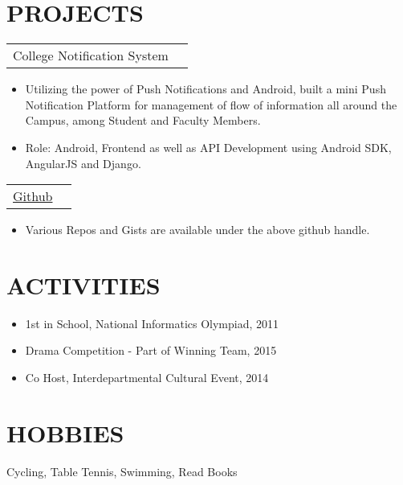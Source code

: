\documentclass[margin]{res}
\begin{document}
\begin{resume}
\section{PROJECTS}
				 \begin{tabular}{p{5in} r} %
                 College Notification System
                 \end{tabular}
                  \begin{itemize}
                   \item[] Utilizing the power of Push Notifications and Android, built a mini Push Notification Platform for management of flow of information all around the Campus, among Student and Faculty Members.
                   \item[] Role: Android, Frontend as well as API Development using Android SDK, AngularJS and Django.
                  \end{itemize}
				 \begin{tabular}{p{5in} r} %
                 \href {www.github.com/SehgalDivij}{Github}
                 \end{tabular}
                  \begin{itemize}
                   \item[] Various Repos and Gists are available under the above github handle.
                  \end{itemize}
\section{ACTIVITIES}
 \begin{itemize}
 \item 1st in School, National Informatics Olympiad, 2011
 \end{itemize}
  \begin{itemize}
 \item Drama Competition - Part of Winning Team, 2015
 \end{itemize}
  \begin{itemize}
 \item Co Host, Interdepartmental Cultural Event, 2014
 \end{itemize}
 
\section{HOBBIES}         Cycling, Table Tennis, Swimming, Read Books
 
\end{resume} 
\end{document}
